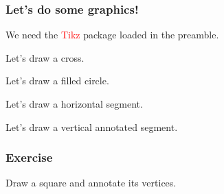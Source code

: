 \documentclass[aspectratio=169,mathserif,10pt]{beamer}
\begin{document}
\begin{frame}
\frametitle{Let's do some graphics!}

We need the \textcolor{red}{Tikz} package loaded in the preamble.

Let's draw a cross.


Let's draw a filled circle.


 Let's draw a horizontal segment.


Let's draw a vertical annotated segment.


\end{frame}

\begin{frame}
\frametitle{Exercise}

Draw a square and annotate its vertices.

\end{frame}
\end{document}
